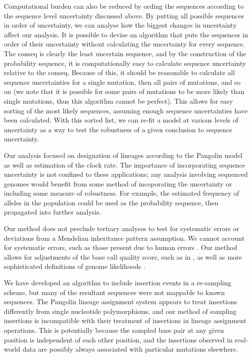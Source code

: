 \documentclass[10pt]{article}
\begin{document}
Computational burden can also be reduced by ording the sequences according to the sequence level uncertainty discussed above.
By putting all possible sequences in order of uncertainty, we can analyse how the biggest changes in uncertainty affect our analysis.
It is possible to devise an algorithm that puts the sequences in order of their uncertainty without calculating the uncertainty for every sequence.
The conseq is clearly the least uncertain sequence, and by the construction of the probability sequence, it is computationally easy to calculate sequence uncertainty relative to the conseq.
Because of this, it should be reasonable to calculate all sequence uncertainties for a single mutation, then all pairs of mutations, and so on (we note that it is possible for some pairs of mutations to be more likely than single mutations, thus this algorithm cannot be perfect).
This allows for easy sorting of the most likely sequences, assuming enough sequence uncertainties have been calculated.
With this sorted list, we can re-fit a model at various levels of uncertainty as a way to test the robustness of a given conclusion to sequence uncertainty.

Our analysis focused on designation of lineages according to the Pangolin model as well as estimation of the clock rate.
The importance of incorporating sequence uncertainty is not confined to these applications; any analysis involving sequenced genomes would benefit from some method of incoporating the uncertainty or including some measure of robustness.
For example, the estimated frequency of alleles in the population could be used as the probability sequence, then propagated into further analysis.

Our method does not preclude tertiary analyses to test for systematic errors or deviations from a Mendelian inheritance pattern assumption.
We cannot account for systematic errors, such as those present due to human errors \citep[\eg human error, as noted in][]{IssuesSARSCoV2Sequencing2020}. 
Our method allows for adjustments of the base call quality score, such as in \citet{brockmanQualityScoresSNP2008}, as well as more sophisticated definitions of genome likelihoods \citep[\eg ][]{liAdjustQualityScores2004, depristoFrameworkVariationDiscovery2011, liSNPDetectionMassively2009}.

We have developed an algorithm to include insertion events in a re-sampling scheme, but many of the resultant sequences were not mappable to known sequences.
The Pangolin lineage assignment system appears to treat insertions differently from single nucleotide polymorphisms, and our method of sampling insertions is incompatible with their treatment of insertions in lineage assignment operations.
This is potentially because the sampled base pair at any given position is independent of each other position, and the insertions observed in real-world data are possibly always associated with particular mutations elsewhere.
\end{document}
